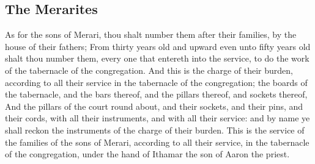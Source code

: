 \begin{biblechapter}
\section*{The Merarites}
\verse As for the sons of Merari, thou shalt number them after their families, by the house of their fathers;
\verse From thirty years old and upward even unto fifty years old shalt thou number them, every one that entereth into the service, to do the work of the tabernacle of the congregation.
\verse And this is the charge of their burden, according to all their service in the tabernacle of the congregation; the boards of the tabernacle, and the bars thereof, and the pillars thereof, and sockets thereof,
\verse And the pillars of the court round about, and their sockets, and their pins, and their cords, with all their instruments, and with all their service: and by name ye shall reckon the instruments of the charge of their burden.
\verse This is the service of the families of the sons of Merari, according to all their service, in the tabernacle of the congregation, under the hand of Ithamar the son of Aaron the priest.

\end{biblechapter}
